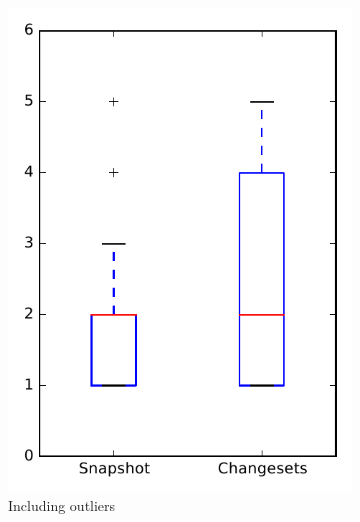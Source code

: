 
\begin{figure}
    \centering
    \begin{subfigure}{.4\textwidth}
        \centering
        \includegraphics[height=0.4\textheight]{figures/dit/rq1_bookkeeper}
        \caption{Including outliers}\label{fig:dit:rq1:bookkeeper_outlier}
    \end{subfigure}%
    \begin{subfigure}{.4\textwidth}
        \centering

\end{subfigure}
\end{figure}
